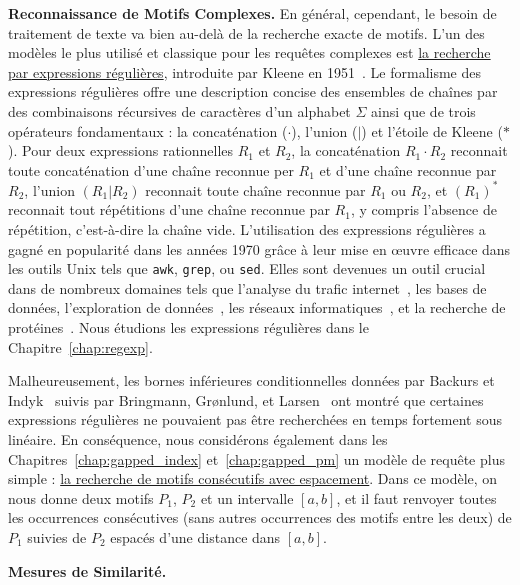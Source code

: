 \noindent\textbf{Reconnaissance de Motifs Complexes.} En général, cependant, le besoin de traitement de texte va bien au-delà de la recherche exacte de motifs.
L'un des modèles le plus utilisé et classique pour les requêtes complexes est \underline{la recherche par expressions régulières}, introduite par Kleene en 1951~\cite{RM-704}.
Le formalisme des expressions régulières offre une description concise des ensembles de chaînes par des combinaisons récursives de caractères d'un alphabet $\Sigma$ ainsi que de trois opérateurs fondamentaux : la concaténation ($\cdot$), l'union ($|$) et l'étoile de Kleene ($\ast$).
Pour deux expressions rationnelles $R_1$ et $R_2$, la concaténation $R_1\cdot R_2$ reconnait toute concaténation d'une chaîne reconnue per $R_1$ et d'une chaîne reconnue par $R_2$, l'union $(R_1|R_2)$ reconnait toute chaîne reconnue par $R_1$ ou $R_2$, et $(R_1)^\ast$ reconnait tout répétitions d'une chaîne reconnue par $R_1$, y compris l'absence de répétition, c'est-à-dire la chaîne vide.
L'utilisation des expressions régulières a gagné en popularité dans les années 1970 grâce à leur mise en œuvre efficace dans les outils Unix tels que \texttt{awk}, \texttt{grep}, ou \texttt{sed}.
Elles sont devenues un outil crucial dans de nombreux domaines tels que l'analyse du trafic internet~\cite{4221791,4579527}, les bases de données, l'exploration de données~\cite{1000341,10.5555/645927.672035,10.1145/375551.375569}, les réseaux informatiques~\cite{10.1145/1159913.1159952}, et la recherche de protéines~\cite{10.1145/369133.369220}.
%
Nous étudions les expressions régulières dans le Chapitre~\ref*{chap:regexp}.

Malheureusement, les bornes inférieures conditionnelles données par Backurs et Indyk~\cite{DBLP:conf/focs/BackursI16} suivis par Bringmann, Gr{\o}nlund, et Larsen~\cite{8104068} ont montré que certaines expressions régulières ne pouvaient pas être recherchées en temps fortement sous linéaire. En conséquence, nous considérons également dans les Chapitres~\ref*{chap:gapped_index} et~\ref*{chap:gapped_pm} un modèle de requête plus simple : \underline{la recherche de motifs consécutifs avec espacement}. 
Dans ce modèle, on nous donne deux motifs $P_1$, $P_2$ et un intervalle $[a, b]$, et il faut renvoyer toutes les occurrences consécutives (sans autres occurrences des motifs entre les deux) de $P_1$ suivies  de $P_2$ espacés d'une distance dans $[a, b]$. 



\noindent\textbf{Mesures de Similarité.} 


